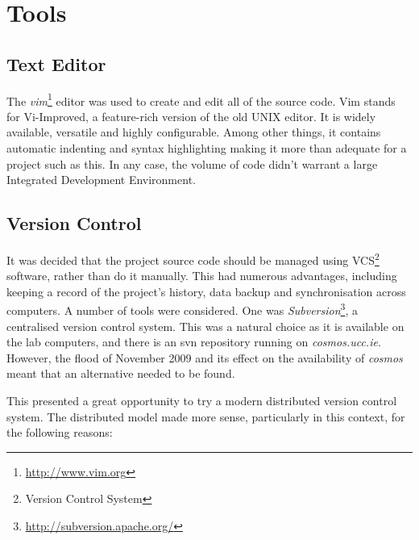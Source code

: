 \section{Tools}

\subsection{Text Editor}

The \emph{vim}\footnote{\url{http://www.vim.org}} editor was used to create and
edit all of the source code. Vim stands for Vi-Improved, a feature-rich version
of the old UNIX editor. It is widely available, versatile and highly
configurable. Among other things, it contains automatic indenting and syntax
highlighting making it more than adequate for a project such as this. In any
case, the volume of code didn't warrant a large Integrated Development
Environment.

\subsection{Version Control}

It was decided that the project source code should be managed using
VCS\footnote{Version Control System} software, rather than do it manually. This
had numerous advantages, including keeping a record of the project's history,
data backup and synchronisation across computers. A number of tools were
considered. One was
\emph{Subversion}\footnote{\url{http://subversion.apache.org/}}, a centralised
version control system. This was a natural choice as it is available on the lab
computers, and there is an svn repository running on \emph{cosmos.ucc.ie}.
However, the flood of November 2009 and its effect on the availability of
\emph{cosmos} meant that an alternative needed to be found.

This presented a great opportunity to try a modern distributed version control
system. The distributed model made more sense, particularly in this context, for
the following reasons:

